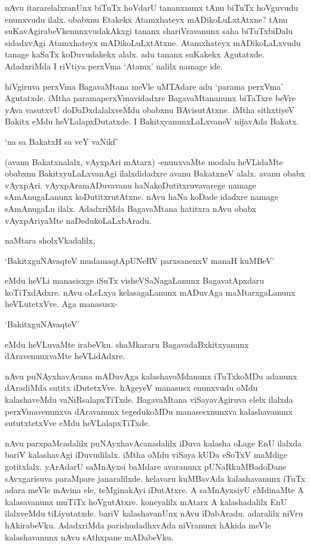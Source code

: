 nAvu itararelalxranUnx biTuTx hoVdarU tananxnunx tAnu biTuTx hoVguvudu enunxvudu ilalx. obabxnu Etakekx Atamxhateyx mADikoLuLxtAtxne? tAnu suKavAgirabeVkenunxvudakAkxgi tananx shariVravanunx saha biTuTxbiDalu sidadxvAgi Atamxhateyx mADikoLuLxtAtxne. Atamxhateyx mADikoLaLxvudu tanage kaSaTx koDuvudakekx alalx. adu tananx suKakekx Agutatxde. AdadxriMda I riVtiya perxVma `Atamx' nalilx namage ide.

hiVgiruva perxVma BagavaMtana meVle uMTAdare adu `parama perxVma' Agutatxde. iMtha paramaperxVmavidadxre BagavaMtananunx biTaTxre beVre yAva vasutxvU doDaDxdalalxveMdu obabxnu BAvisutAtxne. iMtha sithxtiyeV Bakitx eMdu heVLalapxDutatxde. I BakitxyanunxLaLxvaneV nijavAda Bakatx.

\begin{shloka}
`na sa BakatxH sa veY vaNikf'
\end{shloka}

(avanu Bakatxnalalx, vAyxpAri mAtarx) -enunxvaMte modalu heVLidaMte obabxnu BakitxyuLaLxvanAgi ilalxdidadxre avanu BakatxneV alalx. avanu obabx vAyxpAri. vAyxpAramADuvavanu haNakoDutitxruvavarege namage sAmAnugaLanunx koDutitxrutAtxne. nAvu haNa koDade idadxre namage sAmAnugaLu ilalx. AdadxriMda BagavaMtana hatitxra nAvu obabx vAyxpAriyaMte naDedukoLaLxbAradu.

naMtara sholxVkadalilx,

\begin{shloka}
`BakitxguNAvaqteV mudamaqtApUNeRV parxsanenxV manaH kuMBeV'
\end{shloka}

\noindent eMdu heVLi manasisxge iSuTx visheVSaNagaLanunx BagavatApxdaru koTiTxdAdxre. nAvu oLeLxya kelasagaLanunx mADuvAga maMtarxgaLanunx heVLutetxVve. Aga manasusx-

\begin{shloka}
`BakitxguNAvaqteV'
\end{shloka}

\noindent eMdu heVLuvaMte irabeVku. shaMkararu BagavadaBxkitxyanunx dAravenunxvaMte heVLidAdxre.

nAvu puNAyxhavAcana mADuvAga kalashavoMdanunx iTuTxkoMDu adanunx dAradiMda sutitx iDutetxVve. hAgeyeV manasusx enunxvudu oMdu kalashaveMdu vaNiRsalapxTiTxde. BagavaMtana viSayavAgiruva elelx ilalxda perxVmavenunxva dAravanunx tegedukoMDu manasesxnunxva kalashavanunx sututxtetxVve eMdu heVLalapxTiTxde.

nAvu parxpaMcadalilx puNAyxhavAcanadalilx iDuva kalasha oLage EnU ilalxda bariV kalashavAgi iDuvudilalx. iMtha oMdu viSaya kUDa eSoTxV maMdige gotitxlalx. yArAdarU saMnAyxsi baMdare avaranunx pUNaRkuMBadoDane sAvxgarisuva paraMpare janaralilxde. kelavaru kuMBavAda kalashavanunx iTuTx adara meVle mAvina ele, teMginakAyi iDutAtxre. A saMnAyxsiyU eMdinaMte A kalasavanunx muTiTx hoVgutAtxre. koneyalilx mAtarx A kalashadalilx EnU ilalxveMdu tiLiyutatxde. bariV kalashavanUnx nAvu iDabAradu. adaralilx niVru hAkirabeVku. AdadxriMda parishudadhxvAda niVranunx hAkida meVle kalashavanunx nAvu sAthxpane mADabeVku.

